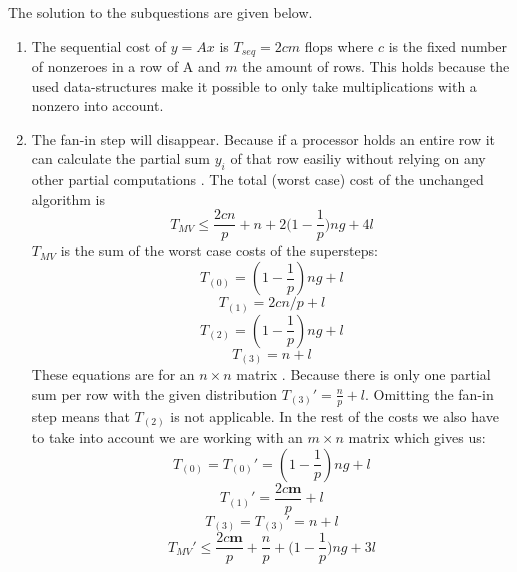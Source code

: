 \documentclass[../main.tex]{subfiles}
\begin{document}
\begin{solution} The solution to the subquestions are given below.
\begin{enumerate}
	\item The sequential cost of $y=Ax$ is $T_{seq} = 2cm$ flops \cite[p.~166]{bisseling04} where $c$ is the fixed number of nonzeroes in a row of A and $m$ the amount of rows. This holds because the used data-structures make it possible to only take multiplications with a nonzero into account.
	\item The fan-in step will disappear. Because if a processor holds an entire row it can calculate the partial sum $y_i$ of that row easiliy without relying on any other partial computations \cite[p.~176]{bisseling04}.  The total (worst case) cost of the unchanged algorithm is
	\begin{equation}
		T_{MV} \leq \frac{2cn}{p} + n + 2 \Big( 1 - \frac{1}{p} \Big) ng + 4l
	\end{equation}
	$T_{MV}$ is the sum of the worst case costs of the supersteps:
	\begin{equation}
		T_{(0)} = \left(1 - \frac{1}{p} \right) ng + l 
	\end{equation}
	\begin{equation}
		T_{(1)} = 2cn/p + l 
	\end{equation}
	\begin{equation}
		T_{(2)} = \left( 1-\frac{1}{p} \right)ng + l
	\end{equation}
	\begin{equation}
		T_{(3)} = n + l
	\end{equation}
	These equations are for an $n \times n$ matrix \cite[p.~178]{bisseling04}. Because there is only one partial sum per row with the given distribution $T_{(3)}' = \frac{n}{p} + l $. Omitting the fan-in step means that $T_{(2)}$ is not applicable. In the rest of the costs we also have to take into account we are working with an $m \times n$ matrix which gives us:
		\begin{equation}
			T_{(0)} = T_{(0)}' = \left(1 - \frac{1}{p} \right) ng + l 
		\end{equation}
		\begin{equation}
			T_{(1)}' = \frac{2c\mathbf{m}}{p} + l 
		\end{equation}
		\begin{equation}
			T_{(3)} = T_{(3)}' = n + l
		\end{equation}
		\begin{equation}
			T_{MV}' \leq \frac{2c\mathbf{m}}{p} + \frac{n}{p} + \Big(1 - \frac{1}{p} \Big) ng + 3l

\end{equation}
\end{enumerate}
\end{solution}
\end{document}
